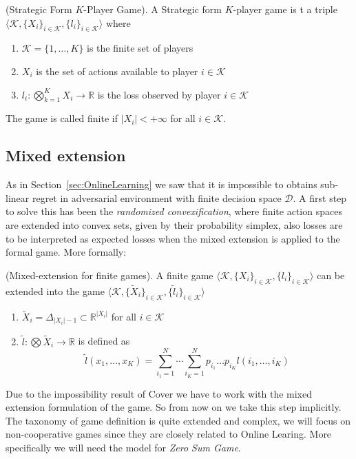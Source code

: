 \begin{definition}(Strategic Form $K$-Player Game).\label{def:Game}
    A Strategic form $K$-player game is t a triple $\langle\mathcal K,\{X_i\}_{i\in\mathcal K},\{l_i\}_{i\in\mathcal K}\rangle$ where
    \begin{enumerate}
        \item $\mathcal K=\{1,\ldots,K\}$ is the finite set of players
        \item $X_i$ is the set of actions available to player $i\in\mathcal K$
        \item $l_i:\bigotimes\limits_{k=1}^KX_i\to\mathbb R$ is the loss observed by player $i\in\mathcal K$
    \end{enumerate}
	The game is called finite if $|X_i|<+\infty$ for all $i\in\mathcal K$.
\end{definition}


\subsection{Mixed extension}\label{sec:mixed}
As in Section~\ref{sec:OnlineLearning} we saw that it is impossible to obtains sub-linear regret in adversarial environment with finite decision space $\mathcal D$. A first step to solve this has been the \emph{randomized convexification}, where finite action spaces are extended into convex sets, given by their probability simplex, also losses are to be interpreted as expected losses when the mixed extension is applied to the formal game. More formally: 

\begin{definition}(Mixed-extension for finite games).
A finite game $\langle\mathcal K,\{X_i\}_{i\in\mathcal K},\{l_i\}_{i\in\mathcal K}\rangle$ can be extended into the game $\langle\mathcal K,\{\tilde X_i\}_{i\in\mathcal K},\{\tilde l_i\}_{i\in\mathcal K}\rangle$
\begin{enumerate}
	\item $\tilde X_i=\Delta_{|X_i|-1}\subset \mathbb R^{|X_i|}$ for all $i\in\mathcal K$ 
	\item $\tilde l:\bigotimes \tilde X_i\to\mathbb R$ is defined as
	$$\tilde l(x_1,\ldots,x_K)=\sum\limits_{i_1=1}^N\cdots\sum\limits_{i_K=1}^Np_{i_1}\ldots p_{i_K}l(i_1,\ldots,i_K)$$ 
\end{enumerate}
\end{definition}

Due to the impossibility result of Cover we have to work with the mixed extension formulation of the game. So from now on we take this step implicitly.
The taxonomy of game definition is quite extended and complex, we will focus on non-cooperative games  since they are closely related to Online Learing. More specifically we will need the model for \emph{Zero Sum Game}. 

